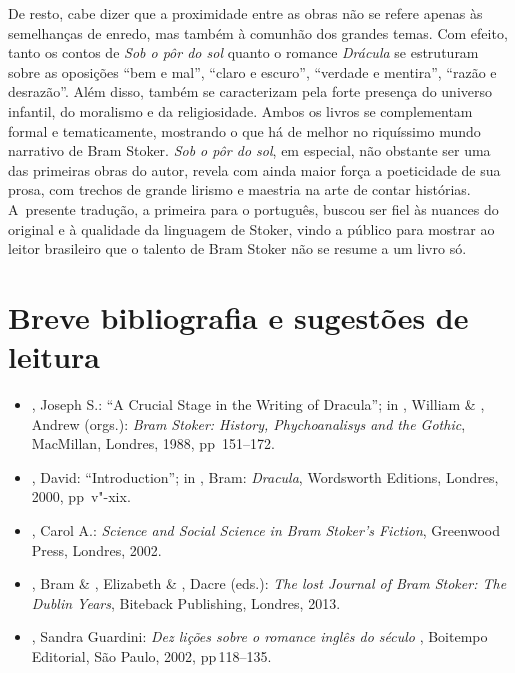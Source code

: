 De resto, cabe dizer que a proximidade entre as obras não se refere
apenas às semelhanças de enredo, mas também à comunhão dos grandes
temas. Com efeito, tanto os contos de \emph{Sob o pôr do sol} quanto o
romance \emph{Drácula} se estruturam sobre as oposições ``bem e mal'',
``claro e escuro'', ``verdade e mentira'', ``razão e desrazão''. Além
disso, também se caracterizam pela forte presença do universo infantil,
do moralismo e da religiosidade. Ambos os livros se complementam formal
e tematicamente, mostrando o que há de melhor no riquíssimo mundo
narrativo de Bram Stoker. \emph{Sob o pôr do sol}, em especial, não
obstante ser uma das primeiras obras do autor, revela com ainda maior
força a poeticidade de sua prosa, com trechos de grande lirismo e
maestria na arte de contar histórias. A~presente tradução, a primeira
para o português, buscou ser fiel às nuances do original e à
qualidade da linguagem de Stoker, vindo a público para mostrar ao leitor
brasileiro que o talento de Bram Stoker não se resume a um livro só.

\asterisc{}
  



\section{Breve bibliografia e sugestões de leitura}


\begin{itemize}
\small
\item
  , Joseph S.: ``A Crucial Stage in the Writing of Dracula''; in
  , William \& , Andrew (orgs.): \emph{Bram Stoker: History,
  Phychoanalisys and the Gothic}, MacMillan, Londres, 1988, pp\,  151--172.
\item
  , David: ``Introduction''; in , Bram: \emph{Dracula},
  Wordsworth Editions, Londres, 2000, pp\, v"-xix.
\item
  , Carol A.: \emph{Science and Social Science in Bram Stoker's
  Fiction}, Greenwood Press, Londres, 2002.
\item
  , Bram \& , Elizabeth \& , Dacre (eds.): \emph{The
  lost Journal of Bram Stoker: The Dublin Years}, Biteback Publishing,
  Londres, 2013.
\item
  , Sandra Guardini: \emph{Dez lições sobre o romance inglês
  do século }, Boitempo Editorial, São Paulo, 2002, pp\,118--135.
\end{itemize}
